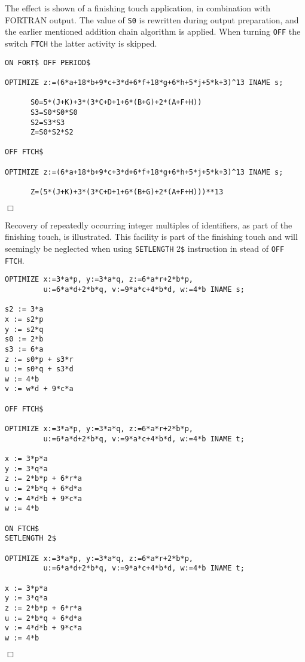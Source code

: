 The effect is shown of a finishing touch application, in combination
with FORTRAN output. The value of {\tt S0} is rewritten during output 
preparation, and the earlier mentioned addition chain algorithm is applied.
When turning {\tt OFF} the switch {\tt FTCH} the latter activity is skipped.
{\small
\begin{verbatim}
ON FORT$ OFF PERIOD$

OPTIMIZE z:=(6*a+18*b+9*c+3*d+6*f+18*g+6*h+5*j+5*k+3)^13 INAME s;

      S0=5*(J+K)+3*(3*C+D+1+6*(B+G)+2*(A+F+H))
      S3=S0*S0*S0
      S2=S3*S3
      Z=S0*S2*S2

OFF FTCH$

OPTIMIZE z:=(6*a+18*b+9*c+3*d+6*f+18*g+6*h+5*j+5*k+3)^13 INAME s;

      Z=(5*(J+K)+3*(3*C+D+1+6*(B+G)+2*(A+F+H)))**13
\end{verbatim}
\begin{flushright}
$\Box$
\end{flushright}}
\example\label{ex:3.1.5}

Recovery of repeatedly occurring integer multiples of identifiers,
as part of the finishing touch, is illustrated. This facility is
part of the finishing touch and will seemingly be neglected when
using {\tt SETLENGTH} 2\verb+$+ instruction in stead of {\tt OFF FTCH}.
{\small
\begin{verbatim}
OPTIMIZE x:=3*a*p, y:=3*a*q, z:=6*a*r+2*b*p,
         u:=6*a*d+2*b*q, v:=9*a*c+4*b*d, w:=4*b INAME s;

s2 := 3*a
x := s2*p
y := s2*q
s0 := 2*b
s3 := 6*a
z := s0*p + s3*r
u := s0*q + s3*d
w := 4*b
v := w*d + 9*c*a

OFF FTCH$

OPTIMIZE x:=3*a*p, y:=3*a*q, z:=6*a*r+2*b*p,
         u:=6*a*d+2*b*q, v:=9*a*c+4*b*d, w:=4*b INAME t;

x := 3*p*a
y := 3*q*a
z := 2*b*p + 6*r*a
u := 2*b*q + 6*d*a
v := 4*d*b + 9*c*a
w := 4*b

ON FTCH$
SETLENGTH 2$

OPTIMIZE x:=3*a*p, y:=3*a*q, z:=6*a*r+2*b*p,
         u:=6*a*d+2*b*q, v:=9*a*c+4*b*d, w:=4*b INAME t;

x := 3*p*a
y := 3*q*a
z := 2*b*p + 6*r*a
u := 2*b*q + 6*d*a
v := 4*d*b + 9*c*a
w := 4*b
\end{verbatim}
\begin{flushright}
$\Box$
\end{flushright}}
\example\label{ex:3.1.6}

